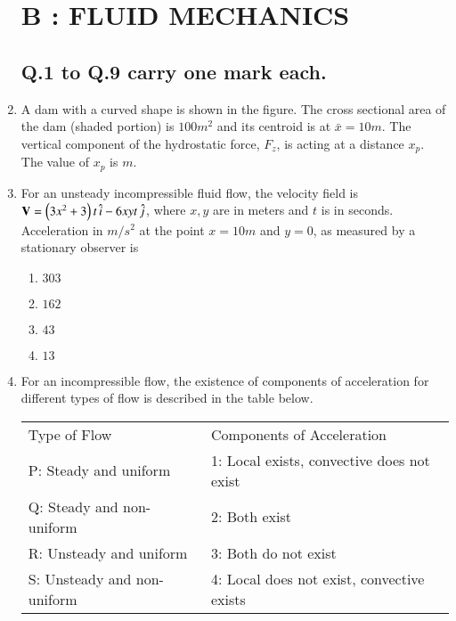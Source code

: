 \documentclass[journal]{IEEEtran}
\begin{document}
\begin{enumerate}
\section*{B : FLUID MECHANICS}

\subsection*{Q.1 to Q.9 carry one mark each.}

    \item A dam with a curved shape is shown in the figure. The cross sectional area of the dam (shaded portion) is $100m^2$ and its centroid is at $\bar{x}=10m$. The vertical component of the hydrostatic force, $F_z$, is acting at a distance $x_p$. The value of $x_p$ is \underline{\hspace{1.5cm}}$m$.
        \begin{figure}[!ht]
            \centering
            
        \end{figure}

    \item For an unsteady incompressible fluid flow, the velocity field is $\mathbf{V}=\left(3x^2+3\right)t\,\hat{i}-6xyt\,\hat{j}$, where $x,y$ are in meters and $t$ is in seconds. Acceleration in $m/s^2$ at the point $x=10m$ and $y=0$, as measured by a stationary observer is
        \begin{enumerate}
            \item $303$
            \item $162$
            \item $43$
            \item $13$
        \end{enumerate}

    \item For an incompressible flow, the existence of components of acceleration for different types of flow is described in the table below.

        \begin{tabular}{l l}
            Type of Flow & Components of Acceleration \\
            P: Steady and uniform & 1: Local exists, convective does not exist \\
            Q: Steady and non-uniform & 2: Both exist \\
            R: Unsteady and uniform & 3: Both do not exist \\
            S: Unsteady and non-uniform & 4: Local does not exist, convective exists \\
        \end{tabular}


\end{enumerate}
\end{document}
